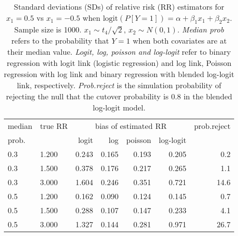 \documentclass[12pt,a4paper]{article}
\begin{document}
\begin{table}[H] 
\small\sf\centering 
\caption{Standard deviations (SDs) of relative risk (RR) estimators for $x_1=0.5$ vs $x_1=-0.5$ when $\mbox{logit}(P[Y=1])=\alpha+\beta_1 x_1 + \beta_2 x_2$. Sample size is 1000. $x_1 \sim $$t_4/\sqrt{2}$, $x_2 \sim N(0,1)$. {\it Median prob} refers to the probability that $Y=1$ when both covariates are at their median value. {\it Logit, log, poisson and log-logit} refer to binary regression with logit link (logistic regression) and log link, Poisson regression with log link and binary regression with blended log-logit link, respectively. {\it Prob.reject} is the simulation probability of rejecting the null that the cutover probability is $0.8$ in the blended log-logit model.} 
\begin{tabular}{llrrrrr} 
\toprule 
median & true RR & \multicolumn{4}{c}{bias of estimated RR} & prob.reject \\ 
prob. & & logit & log & poisson & log-logit  & \\ \midrule 
0.3 & 1.200 & 0.243 & 0.165 & 0.193 & 0.205 &  0.2 \\  
0.3 & 1.500 & 0.378 & 0.176 & 0.217 & 0.265 &  1.1 \\  
0.3 & 3.000 & 1.604 & 0.246 & 0.351 & 0.721 & 14.6 \\  
0.5 & 1.200 & 0.162 & 0.090 & 0.124 & 0.145 &  0.7 \\  
0.5 & 1.500 & 0.288 & 0.107 & 0.147 & 0.233 &  4.1 \\  
0.5 & 3.000 & 1.327 & 0.144 & 0.281 & 0.971 & 26.7 \\  
\bottomrule 
\end{tabular} 
\end{table} 
\end{document}

